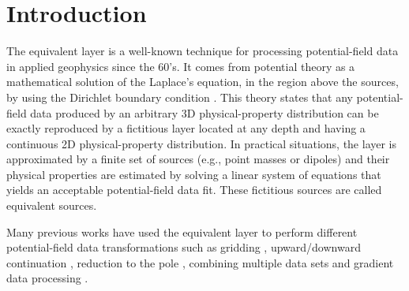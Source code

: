 \section{Introduction}

The equivalent layer is a well-known technique for processing potential-field data in applied geophysics 
since the 60's. 
It comes from potential theory as a mathematical solution of the Laplace's equation, in the region above the
sources, by using the Dirichlet boundary condition \citep{kellogg1929}.
This theory states that any potential-field data produced by an arbitrary 3D physical-property distribution can 
be exactly reproduced by a fictitious layer located at any depth and having a continuous 2D physical-property  
distribution. In practical situations, the layer is approximated by a finite set of sources (e.g., point masses 
or dipoles) and their physical properties are estimated by solving a linear system of equations that yields an 
acceptable potential-field data fit. These fictitious sources are called equivalent sources.

Many previous works have used the equivalent layer to perform different potential-field data 
transformations such as gridding \citep[e.g.,][]{dampney1969, cordell1992, mendonca-silva1994},
upward/downward continuation \citep[e.g.,][]{emilia1973, hansen-miyazaki1984, 
li-oldenburg2010}, reduction to the pole \citep[e.g.,]{silva1986, leao-silva1989, guspi-novara2009, 
oliveirajr-etal2013}, combining multiple data sets \citep[e.g.,][]{boggs-dransfield2004} and 
gradient data processing \citep[e.g.,][]{barnes-lumley2011}.

